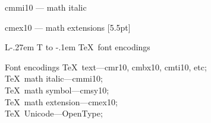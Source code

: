 \documentclass{beamer}
\makeatletter
\newcounter{temp}
\DeclareRobustCommand\LaTeX{L\kern-.27em%
  {\sbox\z@ T%
   \vbox to\ht\z@{\hbox{\check@mathfonts
                        \fontsize\sf@size\z@
                        \math@fontsfalse\selectfont
                        A}%
                  \vss}%
  }%
  \kern-.1em%
  \TeX}
\makeatother
\begin{document}
\begin{frame}{cmmi10 --- math italic}
\end{frame}


\begin{frame}{cmex10 --- math extensions}
[5.5pt]
\end{frame}

\begin{frame}{\LaTeX\ font encodings}
\begin{exampleblock}{Font encodings}
\TeX\ text\hfill ---cmr10, cmbx10, cmti10, etc;\\
\TeX\ math italic\hfill ---cmmi10;\\
\TeX\ math symbol\hfill ---cmsy10;\\
\TeX\ math extension\hfill ---cmex10;\\
\TeX\ Unicode\hfill ---OpenType;
\end{exampleblock}
\end{frame}
\end{document}
